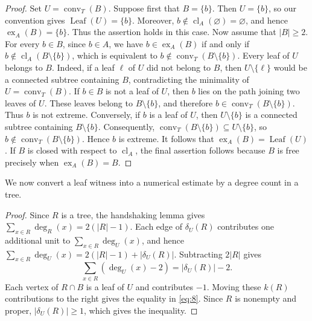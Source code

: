 \documentclass[11pt]{amsart}
\newtheorem{lemma}[theorem]{Lemma}
\theoremstyle{definition}
\newcommand{\cl}{\operatorname{cl}}
\newcommand{\ex}{\operatorname{ex}}
\newcommand{\conv}{\operatorname{conv}}
\begin{document}
\begin{proof}
Set $U=\conv_T(B)$. Suppose first that $B=\{b\}$. Then $U=\{b\}$, so our convention gives $\operatorname{Leaf}(U)=\{b\}$. Moreover, $b\notin\cl_A(\varnothing)=\varnothing$, and hence $\ex_A(B)=\{b\}$. Thus the assertion holds in this case. Now assume that $|B|\ge2$. For every $b\in B$, since $b\in A$, we have $b\in\ex_A(B)$ if and only if $b\notin\cl_A(B\setminus\{b\})$, which is equivalent to $b\notin\conv_T(B\setminus\{b\})$. Every leaf of $U$ belongs to $B$. Indeed, if a leaf $\ell$ of $U$ did not belong to $B$, then $U\setminus\{\ell\}$ would be a connected subtree containing $B$, contradicting the minimality of $U=\conv_T(B)$. If $b\in B$ is not a leaf of $U$, then $b$ lies on the path joining two leaves of $U$. These leaves belong to $B\setminus\{b\}$, and therefore $b\in\conv_T(B\setminus\{b\})$. Thus $b$ is not extreme. Conversely, if $b$ is a leaf of $U$, then $U\setminus\{b\}$ is a connected subtree containing $B\setminus\{b\}$. Consequently, $\conv_T(B\setminus\{b\})\subseteq U\setminus\{b\}$, so $b\notin\conv_T(B\setminus\{b\})$. Hence $b$ is extreme. It follows that $\ex_A(B)=\operatorname{Leaf}(U)$. If $B$ is closed with respect to $\cl_A$, the final assertion follows because $B$ is free precisely when $\ex_A(B)=B$.
\end{proof}

We now convert a leaf witness into a numerical estimate by a degree count in a tree.


\begin{proof}
Since $R$ is a tree, the handshaking lemma gives $\sum_{x\in R}\deg_R(x)=2(|R|-1)$. Each edge of $\delta_U(R)$ contributes one additional unit to $\sum_{x\in R}\deg_U(x)$, and hence $\sum_{x\in R}\deg_U(x)=2(|R|-1)+|\delta_U(R)|$. Subtracting $2|R|$ gives
\[
\sum_{x\in R}(\deg_U(x)-2)=|\delta_U(R)|-2.
\]
Each vertex of $R\cap B$ is a leaf of $U$ and contributes $-1$. Moving these $k(R)$ contributions to the right gives the equality in \cref{eq:8}. Since $R$ is nonempty and proper, $|\delta_U(R)|\ge1$, which gives the inequality.
\end{proof}
\end{document}
